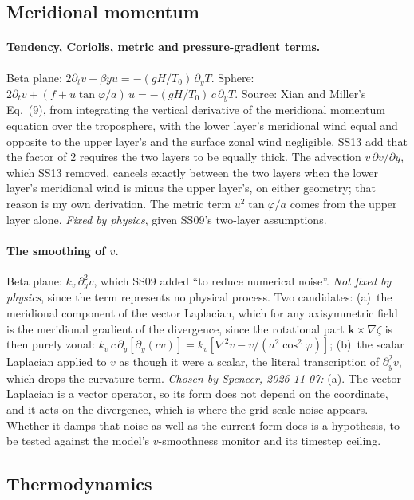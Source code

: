 \documentclass[11pt]{article}
\begin{document}
\subsection{Meridional momentum}
\label{sec:v}

\paragraph{Tendency, Coriolis, metric and pressure-gradient terms.} Beta plane:
$2\partial_t v + \beta y u = -(gH/T_0)\,\partial_y T$. Sphere:
$2\partial_t v + (f + u\tan\varphi/a)\,u = -(gH/T_0)\,c\,\partial_y T$. Source:
Xian and Miller's Eq.~(9), from integrating the vertical derivative of the
meridional momentum equation over the troposphere, with the lower layer's
meridional wind equal and opposite to the upper layer's and the surface zonal
wind negligible. SS13 add that the factor of 2 requires the two layers to be
equally thick. The advection $v\,\partial v/\partial y$, which SS13 removed,
cancels exactly between the two layers when the lower layer's meridional wind is
minus the upper layer's, on either geometry; that reason is my own derivation. The metric term
$u^2\tan\varphi/a$ comes from the upper layer alone. \emph{Fixed by physics},
given SS09's two-layer assumptions.

\paragraph{The smoothing of $v$.} Beta plane: $k_v\,\partial_y^2 v$, which SS09
added ``to reduce numerical noise''. \emph{Not fixed by physics}, since the term
represents no physical process. Two candidates: (a)~the meridional component
of the vector Laplacian, which for any axisymmetric field is the meridional
gradient of the divergence, since the rotational part $\mathbf{k}\times\nabla\zeta$
is then purely zonal:
$k_v\,c\,\partial_y[\partial_y(cv)] = k_v[\nabla^2 v - v/(a^2\cos^2\varphi)]$;
(b)~the scalar Laplacian applied to $v$ as though it were a scalar, the literal
transcription of $\partial_y^2 v$, which drops the curvature term.
\emph{Chosen by Spencer, 2026-11-07:} (a). The vector Laplacian is a vector operator, so its
form does not depend on the coordinate, and it acts on the divergence, which is where the grid-scale
noise appears. Whether it damps that noise as well as the current form does is
a hypothesis, to be tested against the model's $v$-smoothness monitor and its
timestep ceiling.

\subsection{Thermodynamics}
\label{sec:thermo}
\end{document}
